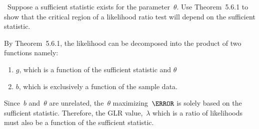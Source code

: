 \begin{problem}
  ~Suppose a sufficient statistic exists for the parameter~$\theta$. Use Theorem~5.6.1 to show that the critical region of a likelihood ratio test will depend on the sufficient statistic.
\end{problem}

By Theorem~5.6.1, the likelihood can be decomposed into the product of two functions namely:
\begin{enumerate}
  \item $g$, which is a function of the sufficient statistic and $\theta$
  \item $b$, which is exclusively a function of the sample data.
\end{enumerate}
Since~$b$ and~$\theta$ are unrelated, the~$\theta$ maximizing~$\g$ is solely based on the sufficient statistic.  Therefore, the GLR value,~$\lambda$ which is a ratio of likelihoods must also be a function of the sufficient statistic.
